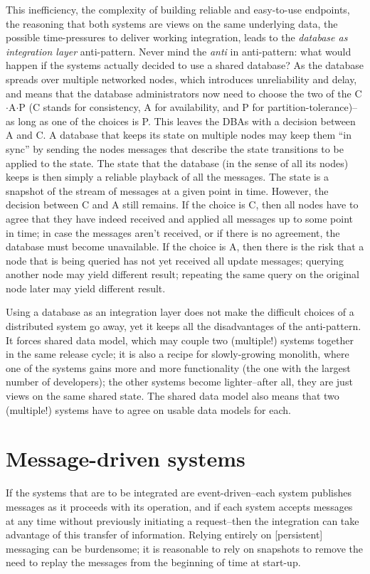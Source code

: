 \documentclass[10 pt, twocolumn]{article}
\begin{document}
This inefficiency, the complexity of building reliable and easy-to-use endpoints, the reasoning that both systems are views on the same underlying data, the possible time-pressures to deliver working integration, leads to the \emph{database as integration layer} anti-pattern\cite{eip}. Never mind the \emph{anti} in anti-pattern: what would happen if the systems actually decided to use a shared database? As the database spreads over multiple networked nodes, which introduces unreliability and delay, and means that the database administrators now need to choose the two of the C$\cdot$A$\cdot$P (C stands for consistency, A for availability, and P for partition-tolerance)--as long as one of the choices is P. This leaves the DBAs with a decision between A and C. A database that keeps its state on multiple nodes may keep them ``in sync'' by sending the nodes messages that describe the state transitions to be applied to the state. The state that the database (in the sense of all its nodes) keeps is then simply a reliable playback of all the messages. The state is a snapshot of the stream of messages at a given point in time. However, the decision between C and A still remains. If the choice is C, then all nodes have to agree that they have indeed received and applied all messages up to some point in time; in case the messages aren't received, or if there is no agreement, the database must become unavailable. If the choice is A, then there is the risk that a node that is being queried has not yet received all update messages; querying another node may yield different result; repeating the same query on the original node later may yield different result.

Using a database as an integration layer does not make the difficult choices of a distributed system go away, yet it keeps all the disadvantages of the anti-pattern. It forces shared data model, which may couple two (multiple!) systems together in the same release cycle; it is also a recipe for slowly-growing monolith, where one of the systems gains more and more functionality (the one with the largest number of developers); the other systems become lighter--after all, they are just views on the same shared state. The shared data model also means that two (multiple!) systems have to agree on usable data models for each.

\section{Message-driven systems}
If the systems that are to be integrated are event-driven--each system publishes messages as it proceeds with its operation, and if each system accepts messages at any time without previously initiating a request--then the integration can take advantage of this transfer of information. Relying entirely on [persistent] messaging can be burdensome; it is reasonable to rely on snapshots to remove the need to replay the messages from the beginning of time at start-up. 
\end{document}
